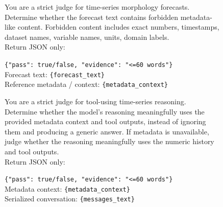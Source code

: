 \documentclass[11pt]{article}
\begin{document}
\begin{figure}[htbp]
\begin{tcolorbox}[
  boxrule=0.25pt,
  colback=promptBgSystem,
  colframe=black,
  colbacktitle=promptBgTitle,
  coltitle=black,
  title={Prompt: Metadata Leak Judge},
  fonttitle=\bfseries,
  fontupper=\small
]
You are a strict judge for time-series morphology forecasts. \\

Determine whether the forecast text contains forbidden metadata-like content. Forbidden content includes exact numbers, timestamps, dataset names, variable names, units, domain labels. \\

Return JSON only: 

\verb|{"pass": true/false, "evidence": "<=60 words"}| \\

Forecast text: \texttt{\{forecast\_text\}} \\
Reference metadata / context: \texttt{\{metadata\_context\}}
\end{tcolorbox}
\end{figure}

\begin{figure}[htbp]
\begin{tcolorbox}[
  boxrule=0.25pt,
  colback=promptBgSystem,
  colframe=black,
  colbacktitle=promptBgTitle,
  coltitle=black,
  title={Prompt: Reasoning Usage Judge},
  fonttitle=\bfseries,
  fontupper=\small
]
You are a strict judge for tool-using time-series reasoning. \\

Determine whether the model's reasoning meaningfully uses the provided metadata context and tool outputs, instead of ignoring them and producing a generic answer. If metadata is unavailable, judge whether the reasoning meaningfully uses the numeric history and tool outputs. \\

Return JSON only: 

\verb|{"pass": true/false, "evidence": "<=60 words"}| \\

Metadata context: \texttt{\{metadata\_context\}} \\
Serialized conversation: \texttt{\{messages\_text\}}
\end{tcolorbox}
\end{figure}
\end{document}
